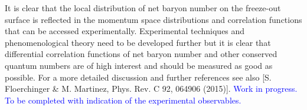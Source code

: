 It is clear that the local distribution of net baryon number on the freeze-out surface is reflected in the momentum space distributions and correlation functions that can be accessed experimentally. Experimental techniques and phenomenological theory need to be developed further but it is clear that differential correlation functions of net baryon number and other conserved quantum numbers are of high interest and should be measured as good as possible. For a more detailed discussion and further references see also [S. Floerchinger \& M. Martinez, Phys. Rev. C 92, 064906 (2015)].
\textcolor{blue}{Work in progress. To be completed with indication of the experimental observables.}
